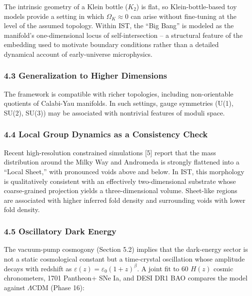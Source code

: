 \documentclass[
]{article}
\begin{document}
The intrinsic geometry of a Klein bottle (\(K_2\)) is flat, so
Klein-bottle-based toy models provide a setting in which
\(\Omega_K \approx 0\) can arise without fine-tuning at the level of the
assumed topology. Within IST, the ``Big Bang'' is modeled as the
manifold's one-dimensional locus of self-intersection -- a structural
feature of the embedding used to motivate boundary conditions rather
than a detailed dynamical account of early-universe microphysics.

\subsubsection{4.3 Generalization to Higher
Dimensions}\label{generalization-to-higher-dimensions}

The framework is compatible with richer topologies, including
non-orientable quotients of Calabi-Yau manifolds. In such settings,
gauge symmetries (U(1), SU(2), SU(3)) may be associated with nontrivial
features of moduli space.

\subsubsection{4.4 Local Group Dynamics as a Consistency
Check}\label{local-group-dynamics-as-a-consistency-check}

Recent high-resolution constrained simulations {[}5{]} report that the
mass distribution around the Milky Way and Andromeda is strongly
flattened into a ``Local Sheet,'' with pronounced voids above and below.
In IST, this morphology is qualitatively consistent with an effectively
two-dimensional substrate whose coarse-grained projection yields a
three-dimensional volume. Sheet-like regions are associated with higher
inferred fold density and surrounding voids with lower fold density.

\subsubsection{4.5 Oscillatory Dark
Energy}\label{oscillatory-dark-energy}

The vacuum-pump cosmogony (Section 5.2) implies that the dark-energy
sector is not a static cosmological constant but a time-crystal
oscillation whose amplitude decays with redshift as
\(\varepsilon(z) = \varepsilon_0(1+z)^\beta\). A joint fit to 60
\(H(z)\) cosmic chronometers, 1701 Pantheon+ SNe Ia, and DESI DR1 BAO
compares the model against \(\Lambda\)CDM (Phase 16):
\end{document}
